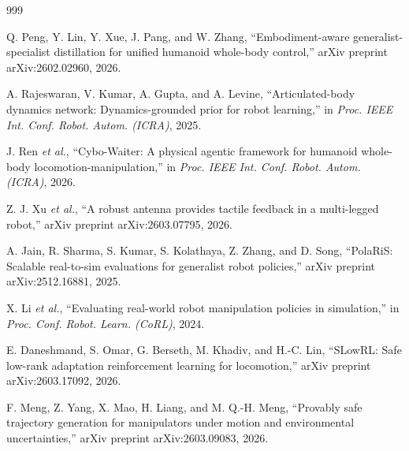 \documentclass[12pt,a4paper,oneside]{report}
\begin{document}
\begin{thebibliography}{999}

Q. Peng, Y. Lin, Y. Xue, J. Pang, and W. Zhang, ``Embodiment-aware generalist-specialist distillation for unified humanoid whole-body control,'' arXiv preprint arXiv:2602.02960, 2026.








A. Rajeswaran, V. Kumar, A. Gupta, and A. Levine, ``Articulated-body dynamics network: Dynamics-grounded prior for robot learning,'' in \textit{Proc. IEEE Int. Conf. Robot. Autom. (ICRA)}, 2025.




J. Ren \textit{et al.}, ``Cybo-Waiter: A physical agentic framework for humanoid whole-body locomotion-manipulation,'' in \textit{Proc. IEEE Int. Conf. Robot. Autom. (ICRA)}, 2026.




Z. J. Xu \textit{et al.}, ``A robust antenna provides tactile feedback in a multi-legged robot,'' arXiv preprint arXiv:2603.07795, 2026.




A. Jain, R. Sharma, S. Kumar, S. Kolathaya, Z. Zhang, and D. Song, ``{PolaRiS}: Scalable real-to-sim evaluations for generalist robot policies,'' arXiv preprint arXiv:2512.16881, 2025.




X. Li \textit{et al.}, ``Evaluating real-world robot manipulation policies in simulation,'' in \textit{Proc. Conf. Robot. Learn. (CoRL)}, 2024.




E. Daneshmand, S. Omar, G. Berseth, M. Khadiv, and H.-C. Lin, ``{SLowRL}: Safe low-rank adaptation reinforcement learning for locomotion,'' arXiv preprint arXiv:2603.17092, 2026.




F. Meng, Z. Yang, X. Mao, H. Liang, and M. Q.-H. Meng, ``Provably safe trajectory generation for manipulators under motion and environmental uncertainties,'' arXiv preprint arXiv:2603.09083, 2026.




\end{thebibliography}
\end{document}
